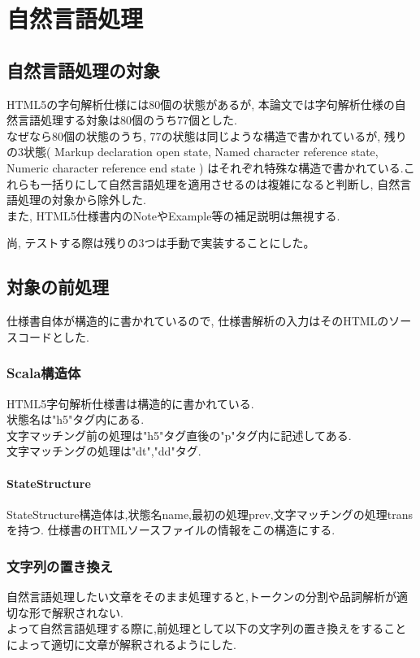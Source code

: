 \documentclass[uplatex,a4j]{jsreport}
\begin{document}
\chapter{自然言語処理}
\label{自然言語処理}
\section{自然言語処理の対象}
HTML5の字句解析仕様には80個の状態があるが, 本論文では字句解析仕様の自然言語処理する対象は80個のうち77個とした.\\
なぜなら80個の状態のうち, 77の状態は同じような構造で書かれているが,
残りの3状態(
Markup declaration open state, 
Named character reference state, 
Numeric character reference end state
)
はそれぞれ特殊な構造で書かれている.これらも一括りにして自然言語処理を適用させるのは複雑になると判断し, 自然言語処理の対象から除外した.
\\
また, HTML5仕様書内のNoteやExample等の補足説明は無視する.

尚, テストする際は残りの3つは手動で実装することにした。


\section{対象の前処理}
仕様書自体が構造的に書かれているので,
仕様書解析の入力はそのHTMLのソースコードとした.\\

\subsection{Scala構造体}
HTML5字句解析仕様書は構造的に書かれている.\\
状態名は"h5"タグ内にある.\\
文字マッチング前の処理は"h5"タグ直後の"p"タグ内に記述してある.\\
文字マッチングの処理は"dt","dd"タグ.
\subsubsection{StateStructure}
StateStructure構造体は,状態名name,最初の処理prev,文字マッチングの処理transを持つ.
仕様書のHTMLソースファイルの情報をこの構造にする.

\subsection{文字列の置き換え}
自然言語処理したい文章をそのまま処理すると,トークンの分割や品詞解析が適切な形で解釈されない.\\
よって自然言語処理する際に,前処理として以下の文字列の置き換えをすることによって適切に文章が解釈されるようにした.
\end{document}
